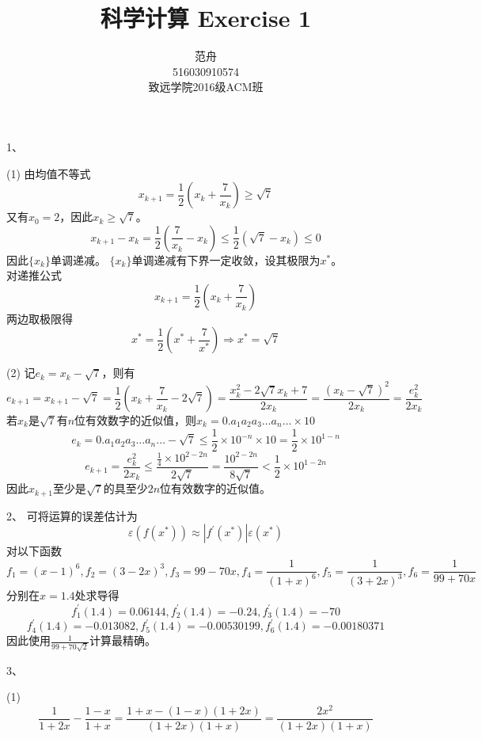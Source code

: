 \documentclass[12pt, a4paper]{article}
\title{科学计算 Exercise 1}
\author{范舟\\516030910574\\致远学院2016级ACM班}
\date{}
\theoremstyle{margin}
\begin{document}
\maketitle

1、 

(1) 由均值不等式 
$$x_{k+1}=\frac{1}{2}\left(x_k+\frac{7}{x_k}\right)\geq\sqrt{7}$$
又有$x_0=2$，因此$x_k\geq\sqrt{7}$。
$$x_{k+1}-x_k=\frac{1}{2}\left(\frac{7}{x_k}-x_k\right)\leq\frac{1}{2}\left(\sqrt{7}-x_k\right)\leq0$$
因此$\{x_k\}$单调递减。
$\{x_k\}$单调递减有下界一定收敛，设其极限为$x^{\ast}$。\\
对递推公式 
$$x_{k+1}=\frac{1}{2}\left(x_k+\frac{7}{x_k}\right)$$
两边取极限得 
$$x^{\ast}=\frac{1}{2}\left(x^{\ast}+\frac{7}{x^{\ast}}\right) \Rightarrow x^{\ast}=\sqrt{7}$$

(2) 记$e_k=x_k-\sqrt{7}$，则有
$$e_{k+1}=x_{k+1}-\sqrt{7}
=\frac{1}{2}\left(x_k+\frac{7}{x_k}-2\sqrt{7}\right)
=\frac{x_k^2-2\sqrt{7}x_k+7}{2x_k}
=\frac{\left(x_k-\sqrt{7}\right)^2}{2x_k}=\frac{e_k^2}{2x_k}$$
若$x_k$是$\sqrt{7}$有$n$位有效数字的近似值，则$x_k=0.a_1a_2a_3\dots a_n \dots\times 10$
$$e_k=0.a_1a_2a_3\dots a_n \dots-\sqrt{7}\leq \frac{1}{2}\times10^{-n}\times 10=\frac{1}{2}\times10^{1-n}$$
$$e_{k+1}=\frac{e_k^2}{2x_k}\leq\frac{\frac{1}{4}\times10^{2-2n}}{2\sqrt{7}}=\frac{10^{2-2n}}{8\sqrt{7}}<\frac{1}{2}\times10^{1-2n}$$
因此$x_{k+1}$至少是$\sqrt{7}$的具至少$2n$位有效数字的近似值。
\newline

2、 可将运算的误差估计为
$$\varepsilon\left(f\left(x^{\ast}\right)\right)\approx |f^{'}\left(x^{\ast}\right)|\varepsilon\left(x^{\ast}\right)$$
对以下函数
$$f_1=\left(x-1\right)^6,f_2=\left(3-2x\right)^3,f_3=99-70x,f_4=\frac{1}{\left(1+x\right)^6},f_5=\frac{1}{\left(3+2x\right)^3},f_6=\frac{1}{99+70x}$$
分别在$x=1.4$处求导得
$$f_1^{'}\left(1.4\right)=0.06144,f_2^{'}\left(1.4\right)=-0.24,f_3^{'}\left(1.4\right)=-70$$
$$f_4^{'}\left(1.4\right)=-0.013082,f_5^{'}\left(1.4\right)=-0.00530199,f_6^{'}\left(1.4\right)=-0.00180371$$
因此使用$\frac{1}{99+70\sqrt{2}}$计算最精确。
\newline

3、 

(1)
$$\frac{1}{1+2x}-\frac{1-x}{1+x}=\frac{1+x-\left(1-x\right)\left(1+2x\right)}{\left(1+2x\right)\left(1+x\right)}=\frac{2x^2}{\left(1+2x\right)\left(1+x\right)}$$
\end{document}

